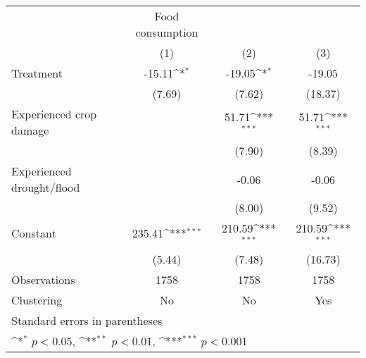 {
\def\sym#1{\ifmmode^{#1}\else\(^{#1}\)\fi}
\begin{tabular}{l*{3}{c}}
\hline\hline
                    &Food consumption                                                 \\
                    &\multicolumn{1}{c}{(1)}         &\multicolumn{1}{c}{(2)}         &\multicolumn{1}{c}{(3)}         \\
\hline
Treatment           &      -15.11\sym{*}  &      -19.05\sym{*}  &      -19.05         \\
                    &      (7.69)         &      (7.62)         &     (18.37)         \\
[1em]
Experienced crop damage&                     &       51.71\sym{***}&       51.71\sym{***}\\
                    &                     &      (7.90)         &      (8.39)         \\
[1em]
Experienced drought/flood&                     &       -0.06         &       -0.06         \\
                    &                     &      (8.00)         &      (9.52)         \\
[1em]
Constant            &      235.41\sym{***}&      210.59\sym{***}&      210.59\sym{***}\\
                    &      (5.44)         &      (7.48)         &     (16.73)         \\
\hline
Observations        &        1758         &        1758         &        1758         \\
Clustering          &          No         &          No         &         Yes         \\
\hline\hline
\multicolumn{4}{l}{\footnotesize Standard errors in parentheses}\\
\multicolumn{4}{l}{\footnotesize \sym{*} \(p<0.05\), \sym{**} \(p<0.01\), \sym{***} \(p<0.001\)}\\
\end{tabular}
}

